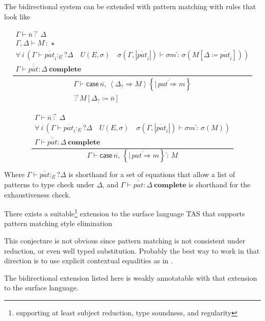 The bidirectional system can be extended with pattern matching with rules that look like 

\[
\frac{\begin{array}{c}
\Gamma\vdash\overline{n}\overrightarrow{\,:\,}\ \Delta\\
\Gamma,\Delta\vdash M\overleftarrow{\,:\,}\star\\
\forall\:i\,\left(\Gamma\vdash\overline{pat}_{i}:_{E}?\Delta\quad U\left(E,\sigma\right)\quad\sigma\left(\Gamma,|\overline{pat}_{i}|\right)\vdash\sigma m\overleftarrow{\,:\,}\sigma\left(M\left[\Delta\coloneqq\overline{pat}_{i}\right]\right)\right)\\
\Gamma\vdash\overline{\overline{pat}}:\Delta\ \mathbf{complete}
\end{array}}{\begin{array}{c}
\Gamma\vdash\mathsf{case}\,\overline{n,}\,\left\langle \Delta_{?}\Rightarrow M\right\rangle \left\{ \overline{|\,\overline{pat\Rightarrow}m}\right\} \\
\overrightarrow{\,:\,}M\left[\Delta_{?}\coloneqq\overline{n}\right]
\end{array}}
\]


\[
\frac{\begin{array}{c}
\Gamma\vdash\overline{n}\overrightarrow{\,:\,}\ \Delta\\
\forall\:i\,\left(\Gamma\vdash\overline{pat}_{i}:_{E}?\Delta\quad U\left(E,\sigma\right)\quad\sigma\left(\Gamma,|\overline{pat}_{i}|\right)\vdash\sigma m\overleftarrow{\,:\,}\sigma\left(M\right)\right)\\
\Gamma\vdash\overline{\overline{pat}}:\Delta\ \mathbf{complete}
\end{array}}{\Gamma\vdash\mathsf{case}\,\overline{n,}\,\left\{ \overline{|\,\overline{pat\Rightarrow}m}\right\} \overleftarrow{\,:\,}M}
\]

Where $\Gamma\vdash\overline{pat}:_{E}?\Delta$ is shorthand for a set of equations that allow a list of patterns to type check under $\Delta$, 
  and $\Gamma\vdash\overline{\overline{pat}}:\Delta\ \mathbf{complete}$ is shorthand for the exhaustiveness check. 
\begin{conjecture}
There exists a suitable\footnote{supporting at least subject reduction, type soundness, and regularity} extension to the surface language \ac{TAS} that supports pattern matching style elimination
\end{conjecture}

This conjecture is not obvious since pattern matching is not consistent under reduction, or even well typed substitution.
Probably the best way to work in that direction is to use explicit contextual equalities as in \cite{sjoberg2012irrelevance}. 
\begin{conjecture}
The bidirectional extension listed here is weakly annotatable with that extension to the surface language.
\end{conjecture}

